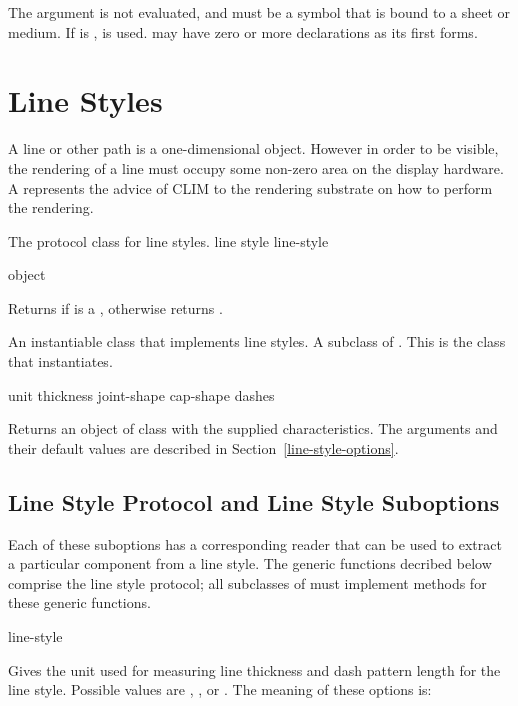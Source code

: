 The  argument is not evaluated, and must be a symbol that is bound
to a sheet or medium.  If  is ,  is
used.   may have zero or more declarations as its first forms.


\section {Line Styles\label{line-styles}}

A line or other path is a one-dimensional object.  However in order to be
visible, the rendering of a line must occupy some non-zero area on the display
hardware.  A  represents the advice of CLIM to the rendering
substrate on how to perform the rendering.


The protocol class for line styles.
 {line style} {line-style}

 {object}

Returns  if  is a , otherwise returns
.


An instantiable class that implements line styles.  A subclass of
.  This is the class that  instantiates.
\Immutable

 {\key unit thickness joint-shape cap-shape dashes}

Returns an object of class  with the supplied
characteristics.  The arguments and their default values are described in
Section~\ref{line-style-options}.


\subsection {Line Style Protocol and Line Style Suboptions\label{line-style-options}}

Each of these suboptions has a corresponding reader that can be used to extract
a particular component from a line style.  The generic functions decribed below
comprise the line style protocol; all subclasses of  must
implement methods for these generic functions.

 {line-style}

Gives the unit used for measuring line thickness and dash pattern length for the
line style.  Possible values are , , or .
The meaning of these options is:

